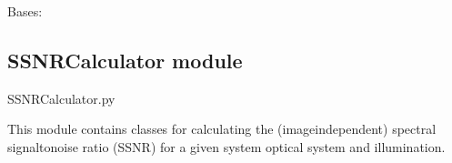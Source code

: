 \documentclass[letterpaper,10pt,english]{sphinxmanual}
\begin{document}
\begin{fulllineitems}
\label{\detokenize{source/SSNRBasedFiltering:SSNRBasedFiltering.WienerFilter3dReconstruction}}
\pysigstartsignatures
\pysiglinewithargsret
{}
{\sphinxparamcomma {}}
{}
\pysigstopsignatures
\sphinxAtStartPar
Bases: {\hyperref[\detokenize{source/SSNRBasedFiltering:SSNRBasedFiltering.WienerFilter3d}]{}}


\begin{fulllineitems}
\label{\detokenize{source/SSNRBasedFiltering:SSNRBasedFiltering.WienerFilter3dReconstruction.filter_object}}
\pysigstartsignatures
\pysiglinewithargsret
{}
{\sphinxparamcomma {}\sphinxparamcomma {}}
{}
\pysigstopsignatures
\end{fulllineitems}


\end{fulllineitems}


\sphinxstepscope


\subsection{SSNRCalculator module}
\label{\detokenize{source/SSNRCalculator:module-SSNRCalculator}}\label{\detokenize{source/SSNRCalculator:ssnrcalculator-module}}\label{\detokenize{source/SSNRCalculator::doc}}
\sphinxAtStartPar
SSNRCalculator.py

\sphinxAtStartPar
This module contains classes for calculating the (image\sphinxhyphen{}independent) spectral signal\sphinxhyphen{}to\sphinxhyphen{}noise ratio (SSNR)
for a given system optical system and illumination.
\end{document}
